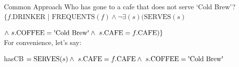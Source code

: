 \documentclass[aspectratio=169]{beamer}
\begin{document}
\begin{frame}{Common Approach}
\hspace{-2em}Who has gone to a cafe that does not serve `Cold Brew'?\\
$\{f.\textrm{DRINKER } | \textrm{ FREQUENTS}(f) \wedge \neg \exists(s)(\textrm{SERVES}(s)$

\hspace{2em}$\wedge\ s.\textrm{COFFEE} = \textrm{\textquotesingle{Cold} Brew\textquotesingle}
	\wedge\ s.\textrm{CAFE} = f.\textrm{CAFE})\}$\\
\hspace{-2em} For convenience, let's say:
 
\hspace{-2em} hasCB $ = \textrm{SERVES}(s) \wedge\ s.\textrm{CAFE} = f.\textrm{CAFE}\wedge\ s.\textrm{COFFEE} = \textrm{\textquotesingle{Cold} Brew\textquotesingle}$
\end{frame}
\end{document}
